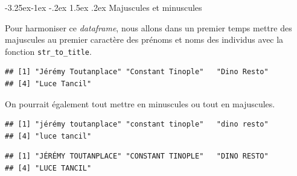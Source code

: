 \documentclass[
  11pt,
  french,
]{book}
\makeatletter
\newenvironment{Shaded}{\begin{snugshade}}{\end{snugshade}}
\newcommand{\KeywordTok}[1]{\textcolor[rgb]{0.13,0.29,0.53}{\textbf{#1}}}
\newcommand{\NormalTok}[1]{#1}
\newcommand{\OperatorTok}[1]{\textcolor[rgb]{0.81,0.36,0.00}{\textbf{#1}}}
\newcommand{\StringTok}[1]{\textcolor[rgb]{0.31,0.60,0.02}{#1}}
\newenvironment{kframe}{%
\medskip{}
\setlength{\fboxsep}{.8em}
 \def\at@end@of@kframe{}%
 \ifinner\ifhmode%
  \def\at@end@of@kframe{\end{minipage}}%
  \begin{minipage}{\columnwidth}%
 \fi\fi%
 \def\FrameCommand##1{\hskip\@totalleftmargin \hskip-\fboxsep
 \colorbox{shadecolor}{##1}\hskip-\fboxsep
     \hskip-\linewidth \hskip-\@totalleftmargin \hskip\columnwidth}%
 \MakeFramed {\advance\hsize-\width
   \@totalleftmargin\z@ \linewidth\hsize
   \@setminipage}}%
 {\par\unskip\endMakeFramed%
 \at@end@of@kframe}
\renewenvironment{Shaded}{\begin{kframe}}{\end{kframe}}
\renewcommand\paragraph{\@startsection{paragraph}{4}{\z@}%
   {-3.25ex\@plus -1ex \@minus -.2ex}%
   {1.5ex \@plus .2ex}%
   {\normalfont\normalsize\bfseries}}
\makeatother
\begin{document}
\hypertarget{sect014251}{%
\paragraph{Majuscules et minuscules}\label{sect014251}}

Pour harmoniser ce \emph{dataframe}, nous allons dans un premier temps mettre des majuscules au premier caractère des prénoms et noms des individus avec la fonction \texttt{str\_to\_title}.

\begin{Shaded}
\end{Shaded}

\begin{verbatim}
## [1] "Jérémy Toutanplace" "Constant Tinople"   "Dino Resto"        
## [4] "Luce Tancil"
\end{verbatim}

On pourrait également tout mettre en minuscules ou tout en majuscules.

\begin{Shaded}
\end{Shaded}

\begin{verbatim}
## [1] "jérémy toutanplace" "constant tinople"   "dino resto"        
## [4] "luce tancil"
\end{verbatim}

\begin{Shaded}
\end{Shaded}

\begin{verbatim}
## [1] "JÉRÉMY TOUTANPLACE" "CONSTANT TINOPLE"   "DINO RESTO"        
## [4] "LUCE TANCIL"
\end{verbatim}
\end{document}
